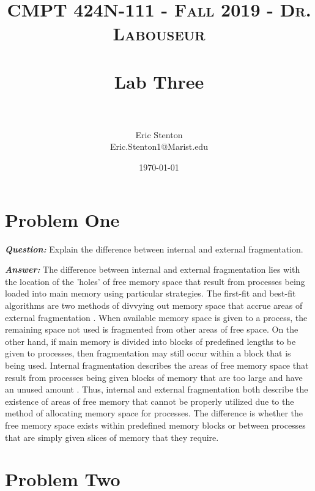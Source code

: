 \documentclass[letterpaper, 10pt,DIV=13]{scrartcl}
\title{	
   \normalfont \normalsize 
   \textsc{CMPT 424N-111 - Fall 2019 - Dr. Labouseur} \\[10pt] %
   \horrule{0.5pt} \\[0.25cm] 	%
   \huge Lab Three  \\     	    %
   \horrule{0.5pt} \\[0.25cm] 	%
}
\author{Eric Stenton \\ \normalsize Eric.Stenton1@Marist.edu}
\date{\normalsize\today} 	%
\numberwithin{equation}{section} %
\numberwithin{figure}{section} %
\numberwithin{table}{section} %
\begin{document}
\maketitle %

\section{Problem One}

\textbf{\emph{Question:}}
Explain the difference between internal and external fragmentation.

\textbf{\emph{Answer:}}
The difference between internal and external fragmentation lies with the location of the 'holes' of free memory space that result from processes being loaded into main memory using particular strategies. The first-fit and best-fit algorithms are two methods of divvying out memory space that accrue areas of external fragmentation \cite{concepts}. When available memory space is given to a process, the remaining space not used is fragmented from other areas of free space. On the other hand, if main memory is divided into blocks of predefined lengths to be given to processes, then fragmentation may still occur within a block that is being used. Internal fragmentation describes the areas of free memory space that result from processes being given blocks of memory that are too large and have an unused amount \cite{concepts}. Thus, internal and external fragmentation both describe the existence of areas of free memory that cannot be properly utilized due to the method of allocating memory space for processes. The difference is whether the free memory space exists within predefined memory blocks or between processes that are simply given slices of memory that they require. 


\pagebreak

\section{Problem Two}
\end{document}
